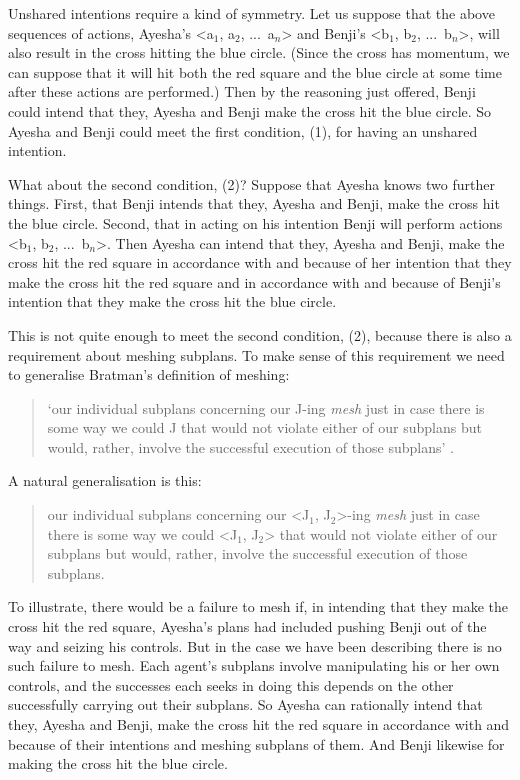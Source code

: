 \documentclass[12pt,\papersize]{extarticle}
\begin{document}
Unshared intentions require a kind of symmetry.
Let us suppose that the above sequences of actions,
	Ayesha's <a$_1$, a$_2$, ...\ a$_n$>  and 
	Benji's <b$_1$, b$_2$, ...\ b$_n$>,
will also result in the cross hitting the blue circle. 
(Since the cross has momentum, we can suppose that it will hit both the red square and the blue circle at some time after these actions are performed.)
Then by the reasoning just offered, Benji could intend that they, Ayesha and Benji make the cross hit the blue circle.
So Ayesha and Benji could meet the first condition, (1), for having an unshared intention.

What about the second condition, (2)?
Suppose that Ayesha knows two further things.
First, that Benji intends that they, Ayesha and Benji, make the cross hit the blue circle.
Second, that in acting on his intention Benji will perform actions <b$_1$, b$_2$, ...\ b$_n$>.
Then Ayesha can intend that they, Ayesha and Benji, make the cross hit the red square in accordance with and because of her intention that they make the cross hit the red square and in accordance with and because of Benji's intention that they make the cross hit the blue circle.

This is not quite enough to meet the second condition, (2), because there is also a requirement about meshing subplans. 
To make sense of this requirement we need to generalise Bratman's definition of meshing:
\begin{quote}
`our individual subplans concerning our J-ing \emph{mesh} just in case there is some way we could J that would not violate either of our subplans but would, rather, involve the successful execution of those subplans' \citep[p.\ 106]{Bratman:1993je}.
\end{quote}
A natural generalisation is this:
\begin{quote}
our individual subplans concerning our <J$_1$, J$_2$>-ing \emph{mesh} just in case there is some way we could <J$_1$, J$_2$> that would not violate either of our subplans but would, rather, involve the successful execution of those subplans. 
\end{quote}
%
To illustrate, 
there would be a failure to mesh if, in intending that they make the cross hit the red square,  Ayesha's plans had included pushing Benji out of the way and seizing his controls. 
But in the case we have been describing there is no such failure to mesh.
Each agent's subplans involve manipulating his or her own controls,
and the successes each seeks in doing this depends on the other successfully carrying out their subplans.
So Ayesha can rationally intend that they, Ayesha and Benji, make the cross hit the red square in accordance with and because of their intentions and meshing subplans of them.
And Benji likewise for making the cross hit the blue circle.
\end{document}
